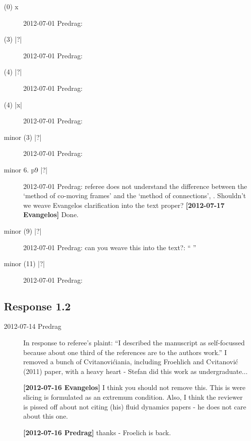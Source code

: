 \begin{description}
\item[(0)  x ] 2012-07-01 Predrag:

\item[(3) |?|] 2012-07-01 Predrag:

\item[(4) |?|] 2012-07-01 Predrag:

\item[(4) |x|] 2012-07-01 Predrag:

\item[minor (3) |?|] 2012-07-01 Predrag:

\item[minor 6. p9 |?|] 2012-07-01 Predrag: referee does not understand the difference between the `method of
 co-moving frames' and the `method of connections', . Shouldn't we
 weave Evangelos clarification into the text proper? {\bf [2012-07-17 Evangelos]} Done.

\item[minor (9) |?|] 2012-07-01 Predrag: can you weave this into the text?: ``
''

\item[minor (11) |?|] 2012-07-01 Predrag:

\end{description}

\subsection{Response 1.2}
\label{sect:Response1.2}

\begin{description}

\item[2012-07-14 Predrag] In response to referee's plaint:
``I described the manuscript as self-focussed because about one third of
the references are to the authors work.'' I removed a bunch of
Cvitanovi\'ciania, including Froehlich and Cvitanovi\'c (2011) paper, with
a heavy heart - Stefan did this work as undergraduate...

{\bf [2012-07-16 Evangelos]} I think you should not remove this. This is were
		slicing is formulated as an extremum condition. Also,
		I think the reviewer is pissed off about not citing (his)
		fluid dynamics papers - he does not care about this one.

{\bf [2012-07-16 Predrag]} thanks - Froelich is back.


\end{description}
